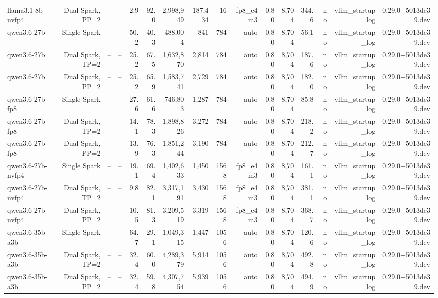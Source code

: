 \begin{tabular}{l r r r r r r r r r r r r r r r }
llama3.1-8b-nvfp4 & Dual Spark, PP=2 & -- & -- & 2.9 & 92.0 & 2,998,949 & 187,434 & 16 & fp8\_e4m3 & 0.80 & 8,704 & 344.6 & no & vllm\_startup\_log & 0.29.0+5013de39.dev \\
qwen3.6-27b & Single Spark & -- & -- & 50.2 & 40.3 & 488,004 & 841 & 784 & auto & 0.80 & 8,704 & 56.1 & no & vllm\_startup\_log & 0.29.0+5013de39.dev \\
qwen3.6-27b & Dual Spark, TP=2 & -- & -- & 25.2 & 67.5 & 1,632,870 & 2,814 & 784 & auto & 0.80 & 8,704 & 187.6 & no & vllm\_startup\_log & 0.29.0+5013de39.dev \\
qwen3.6-27b & Dual Spark, PP=2 & -- & -- & 25.2 & 65.9 & 1,583,741 & 2,729 & 784 & auto & 0.80 & 8,704 & 182.0 & no & vllm\_startup\_log & 0.29.0+5013de39.dev \\
qwen3.6-27b-fp8 & Single Spark & -- & -- & 27.6 & 61.6 & 746,803 & 1,287 & 784 & auto & 0.80 & 8,704 & 85.8 & no & vllm\_startup\_log & 0.29.0+5013de39.dev \\
qwen3.6-27b-fp8 & Dual Spark, TP=2 & -- & -- & 14.1 & 78.3 & 1,898,826 & 3,272 & 784 & auto & 0.80 & 8,704 & 218.2 & no & vllm\_startup\_log & 0.29.0+5013de39.dev \\
qwen3.6-27b-fp8 & Dual Spark, PP=2 & -- & -- & 13.9 & 76.3 & 1,851,244 & 3,190 & 784 & auto & 0.80 & 8,704 & 212.7 & no & vllm\_startup\_log & 0.29.0+5013de39.dev \\
qwen3.6-27b-nvfp4 & Single Spark & -- & -- & 19.1 & 69.4 & 1,402,633 & 1,450 & 1568 & fp8\_e4m3 & 0.80 & 8,704 & 161.1 & no & vllm\_startup\_log & 0.29.0+5013de39.dev \\
qwen3.6-27b-nvfp4 & Dual Spark, TP=2 & -- & -- & 9.8 & 82.1 & 3,317,191 & 3,430 & 1568 & fp8\_e4m3 & 0.80 & 8,704 & 381.1 & no & vllm\_startup\_log & 0.29.0+5013de39.dev \\
qwen3.6-27b-nvfp4 & Dual Spark, PP=2 & -- & -- & 10.5 & 81.3 & 3,209,519 & 3,319 & 1568 & fp8\_e4m3 & 0.80 & 8,704 & 368.7 & no & vllm\_startup\_log & 0.29.0+5013de39.dev \\
qwen3.6-35b-a3b & Single Spark & -- & -- & 64.7 & 29.1 & 1,049,315 & 1,447 & 1056 & auto & 0.80 & 8,704 & 120.6 & no & vllm\_startup\_log & 0.29.0+5013de39.dev \\
qwen3.6-35b-a3b & Dual Spark, TP=2 & -- & -- & 32.4 & 60.0 & 4,289,379 & 5,914 & 1056 & auto & 0.80 & 8,704 & 492.8 & no & vllm\_startup\_log & 0.29.0+5013de39.dev \\
qwen3.6-35b-a3b & Dual Spark, PP=2 & -- & -- & 32.4 & 59.8 & 4,307,754 & 5,939 & 1056 & auto & 0.80 & 8,704 & 494.9 & no & vllm\_startup\_log & 0.29.0+5013de39.dev \\

\end{tabular}
